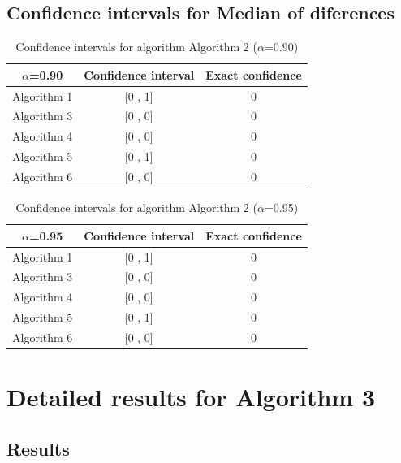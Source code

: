 \documentclass[a4paper,10pt]{article}
\begin{document}
\subsection{Confidence intervals for Median of diferences}

\begin{table}[!htp]
\centering\small
\begin{tabular}{
|c|c|c|}
\hline
 $\alpha$=0.90 & Confidence interval & Exact confidence \\ \hline 
Algorithm 1 & [0 , 1] & 0\\ \hline 
Algorithm 3 & [0 , 0] & 0\\ \hline 
Algorithm 4 & [0 , 0] & 0\\ \hline 
Algorithm 5 & [0 , 1] & 0\\ \hline 
Algorithm 6 & [0 , 0] & 0\\ \hline 

\end{tabular}
\caption{Confidence intervals for algorithm Algorithm 2 ($\alpha$=0.90)}
\end{table}
\begin{table}[!htp]
\centering\small
\begin{tabular}{
|c|c|c|}
\hline
 $\alpha$=0.95 & Confidence interval & Exact confidence \\ \hline 
Algorithm 1 & [0 , 1] & 0\\ \hline 
Algorithm 3 & [0 , 0] & 0\\ \hline 
Algorithm 4 & [0 , 0] & 0\\ \hline 
Algorithm 5 & [0 , 1] & 0\\ \hline 
Algorithm 6 & [0 , 0] & 0\\ \hline 

\end{tabular}
\caption{Confidence intervals for algorithm Algorithm 2 ($\alpha$=0.95)}
\end{table}

 \clearpage 


\section{Detailed results for Algorithm 3}


\subsection{Results}
\end{document}
